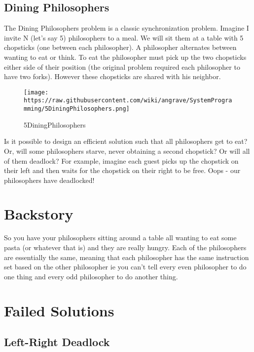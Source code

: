 \subsection{Dining Philosophers}\label{dining-philosophers}

The Dining Philosophers problem is a classic synchronization problem.
Imagine I invite N (let's say 5) philosophers to a meal. We will sit
them at a table with 5 chopsticks (one between each philosopher). A
philosopher alternates between wanting to eat or think. To eat the
philosopher must pick up the two chopsticks either side of their
position (the original problem required each philosopher to have two
forks). However these chopsticks are shared with his neighbor.

\begin{figure}[htbp]
\centering
\texttt{[image: https://raw.githubusercontent.com/wiki/angrave/SystemProgramming/5DiningPhilosophers.png]}
\caption{5DiningPhilosophers}
\end{figure}

Is it possible to design an efficient solution such that all
philosophers get to eat? Or, will some philosophers starve, never
obtaining a second chopstick? Or will all of them deadlock? For example,
imagine each guest picks up the chopstick on their left and then waits
for the chopstick on their right to be free. Oops - our philosophers
have deadlocked!

\section{Backstory}\label{backstory}

So you have your philosophers sitting around a table all wanting to eat
some pasta (or whatever that is) and they are really hungry. Each of the
philosophers are essentially the same, meaning that each philosopher has
the same instruction set based on the other philosopher ie you can't
tell every even philosopher to do one thing and every odd philosopher to
do another thing.

\section{Failed Solutions}\label{failed-solutions}

\subsection{Left-Right Deadlock}\label{left-right-deadlock}

